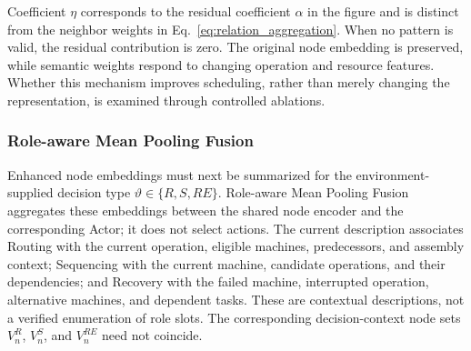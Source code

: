 Coefficient $\eta$ corresponds to the residual coefficient $\alpha$ in the figure and is distinct
from the neighbor weights in Eq.~\eqref{eq:relation_aggregation}. When no pattern is valid,
the residual contribution is zero. The original node embedding is preserved, while semantic weights
respond to changing operation and resource features. Whether this mechanism improves scheduling,
rather than merely changing the representation, is examined through controlled ablations.



\subsubsection{Role-aware Mean Pooling Fusion}
Enhanced node embeddings must next be summarized for the environment-supplied decision type
$\vartheta\in\{R,S,RE\}$. Role-aware Mean Pooling Fusion aggregates these embeddings between
the shared node encoder and the corresponding Actor; it does not select actions.
The current description associates Routing with the current operation, eligible machines,
predecessors, and assembly context; Sequencing with the current machine, candidate operations,
and their dependencies; and Recovery with the failed machine, interrupted operation,
alternative machines, and dependent tasks. These are contextual descriptions, not a verified
enumeration of role slots. The corresponding decision-context node sets
$V_n^R$, $V_n^S$, and $V_n^{RE}$ need not coincide.

